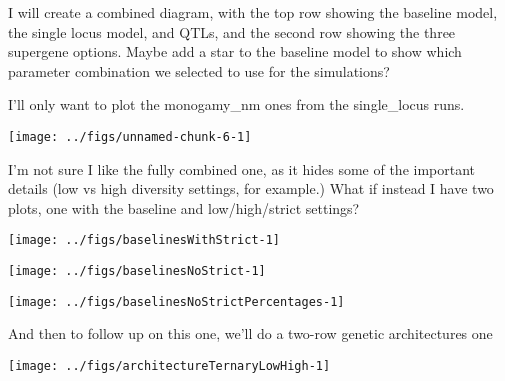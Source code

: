 \documentclass[
]{article}
\begin{document}
I will create a combined diagram, with the top row showing the baseline
model, the single locus model, and QTLs, and the second row showing the
three supergene options. Maybe add a star to the baseline model to show
which parameter combination we selected to use for the simulations?

I'll only want to plot the monogamy\_nm ones from the single\_locus
runs.

\texttt{[image: ../figs/unnamed-chunk-6-1]}

I'm not sure I like the fully combined one, as it hides some of the
important details (low vs high diversity settings, for example.) What if
instead I have two plots, one with the baseline and low/high/strict
settings?

\texttt{[image: ../figs/baselinesWithStrict-1]}

\texttt{[image: ../figs/baselinesNoStrict-1]}

\texttt{[image: ../figs/baselinesNoStrictPercentages-1]}

And then to follow up on this one, we'll do a two-row genetic
architectures one

\texttt{[image: ../figs/architectureTernaryLowHigh-1]}
\end{document}
